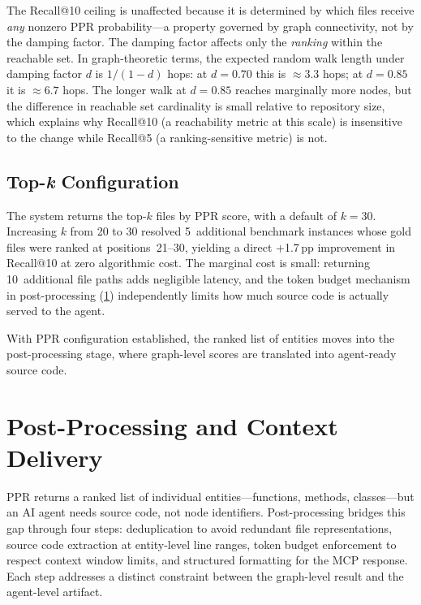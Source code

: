 The Recall@10 ceiling is unaffected because it is determined by which files receive \emph{any} nonzero PPR probability---a property governed by graph connectivity, not by the damping factor. The damping factor affects only the \emph{ranking} within the reachable set. In graph-theoretic terms, the expected random walk length under damping factor $d$ is $1/(1-d)$ hops: at $d = 0.70$ this is $\approx 3.3$ hops; at $d = 0.85$ it is $\approx 6.7$ hops. The longer walk at $d = 0.85$ reaches marginally more nodes, but the difference in reachable set cardinality is small relative to repository size, which explains why Recall@10 (a reachability metric at this scale) is insensitive to the change while Recall@5 (a ranking-sensitive metric) is not.

\subsection{Top-\textit{k} Configuration}
\label{sec:topk}

The system returns the top-$k$ files by PPR score, with a default of $k = 30$. Increasing $k$ from 20 to 30 resolved 5~additional benchmark instances whose gold files were ranked at positions~21--30, yielding a direct +1.7\,pp improvement in Recall@10 at zero algorithmic cost. The marginal cost is small: returning 10~additional file paths adds negligible latency, and the token budget mechanism in post-processing (\cref{sec:post-processing}) independently limits how much source code is actually served to the agent.

With PPR configuration established, the ranked list of entities moves into the post-processing stage, where graph-level scores are translated into agent-ready source code.


\section{Post-Processing and Context Delivery}
\label{sec:post-processing}

PPR returns a ranked list of individual entities---functions, methods, classes---but an AI agent needs source code, not node identifiers. Post-processing bridges this gap through four steps: deduplication to avoid redundant file representations, source code extraction at entity-level line ranges, token budget enforcement to respect context window limits, and structured formatting for the MCP response. Each step addresses a distinct constraint between the graph-level result and the agent-level artifact.

